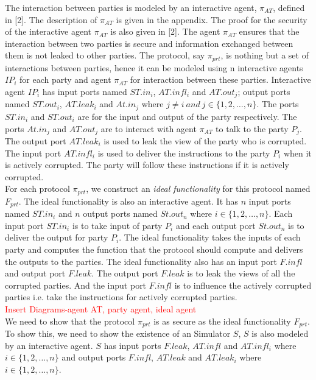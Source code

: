 \documentclass{llncs}
\begin{document}
\begin{itemize}
The interaction between parties is modeled by an interactive agent, $ \pi_{AT} $, defined in [2]. The description of $ \pi_{AT} $ is given in the appendix. The proof for the security of the interactive agent $ \pi_{AT} $ is also given in [2]. The agent $ \pi_{AT} $ ensures that the interaction between two parties is secure and information exchanged between them is not leaked to other parties. The protocol, say $ \pi_{prt} $, is nothing but a set of interactions between parties, hence it can be modeled using n interactive agents $ IP_i $ for each party and agent $ \pi_{AT} $ for interaction between these parties. Interactive agent $ IP_i $ has input ports named $ ST.in_i $, $ AT.infl_i $ and $ AT.out_j $; output ports named $ ST.out_i $, $ AT.leak_i $ and $ At.in_j $ where $ j\neq i\ and\ j\in \{1,2,\dots,n\} $. The ports $ ST.in_i $ and $ ST.out_i $ are for the input and output of the party respectively. The ports $ At.in_j $ and $ AT.out_j $ are to interact with agent $ \pi_{AT} $ to talk to the party $ P_j $. The output port $ AT.leak_i $ is used to leak the view of the party who is corrupted. The input port $ AT.infl_i $ is used to deliver the instructions to the party $ P_i $ when it is actively corrupted. The party will follow these instructions if it is actively corrupted.\\
For each protocol $ \pi_{prt} $, we construct an \textit{ideal functionality} for this protocol named $ F_{prt} $. The ideal functionality is also an interactive agent. It has $ n $ input ports named $ ST.in_i $ and $ n $ output ports named $ St.out_n $ where $ i\in \{1,2,\dots,n\} $. Each input port $ ST.in_i $ is to take input of party $ P_i $ and each output port $ St.out_n $ is to deliver the output for party $ P_i $. The ideal functionality takes the inputs of each party and computes the function that the protocol should compute and delivers the outputs to the parties. The ideal functionality also has an input port $ F.infl $ and output port $ F.leak $. The output port $ F.leak $ is to leak the views of all the corrupted parties. And the input port $ F.infl $ is to influence the actively corrupted parties i.e. take the instructions for actively corrupted parties.\\
\textcolor{red}{Insert Diagrams-agent AT, party agent, ideal agent}\\
We need to show that the protocol $ \pi_{prt} $ is as secure as the ideal functionality $ F_{prt} $. To show this, we need to show the existence of an Simulator $ S $, $ S $ is also modeled by an interactive agent. $ S $ has input ports $ F.leak $, $ AT.infl $ and $ AT.infl_i $ where $ i\in \{1,2,\dots,n\} $ and output ports $ F.infl $, $ AT.leak $ and $ AT.leak_i $ where $ i\in \{1,2,\dots,n\} $. 

\end{itemize}
\end{document}
